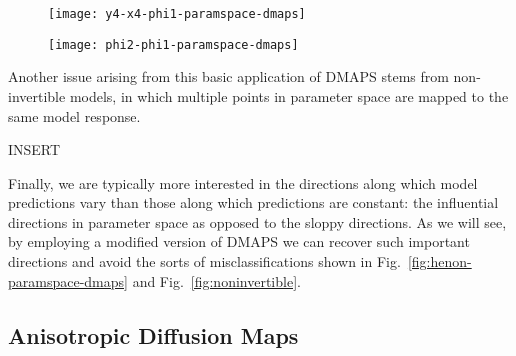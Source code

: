 \begin{figure*}
  \centering
  \begin{subfigure}[t]{0.45\linewidth}
    \centering
    \texttt{[image: y4-x4-phi1-paramspace-dmaps]}
  \end{subfigure}
  \hspace{0.5cm}
  \begin{subfigure}[t]{0.45\linewidth}
    \centering
    \texttt{[image: phi2-phi1-paramspace-dmaps]}
  \end{subfigure}
  \caption[Parameter space of singularly perturbed system colored by
  DMAPS]
  {Result of applying DMAPS to transformed parameter space,
    incorrectly identifying the system as
    one-dimensional. \label{fig:henon-paramspace-dmaps} }
\end{figure*}


Another issue arising from this basic application of DMAPS stems from
non-invertible models, in which multiple points in parameter space are
mapped to the same model response.

INSERT

Finally, we are typically more interested in the directions along
which model predictions vary than those along which predictions are
constant: the influential directions in parameter space as opposed to
the sloppy directions. As we will see, by employing a modified version
of DMAPS we can recover such important directions and avoid the sorts
of misclassifications shown in Fig.~\ref{fig:henon-paramspace-dmaps}
and Fig.~\ref{fig:noninvertible}.

\subsection{Anisotropic Diffusion Maps}

